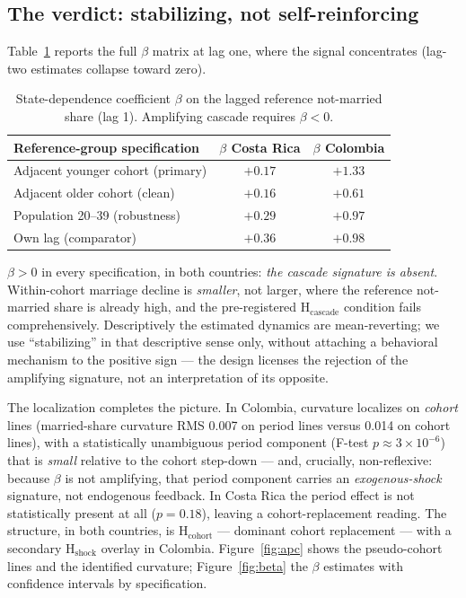 \subsection{The verdict: stabilizing, not self-reinforcing}
\label{sec:verdict}

Table~\ref{tab:beta} reports the full $\beta$ matrix at lag one, where the
signal concentrates (lag-two estimates collapse toward zero).

\begin{table}[t]
\centering
\caption{State-dependence coefficient $\beta$ on the lagged reference
not-married share (lag 1). Amplifying cascade requires $\beta<0$.}
\label{tab:beta}
\begin{tabular}{lcc}
\toprule
Reference-group specification & $\beta$ Costa Rica & $\beta$ Colombia \\
\midrule
Adjacent younger cohort (primary) & $+0.17$ & $+1.33$ \\
Adjacent older cohort (clean)     & $+0.16$ & $+0.61$ \\
Population 20--39 (robustness)    & $+0.29$ & $+0.97$ \\
Own lag (comparator)              & $+0.36$ & $+0.98$ \\
\bottomrule
\end{tabular}
\end{table}

$\beta > 0$ in every specification, in both countries: \emph{the cascade
signature is absent}. Within-cohort marriage decline is \emph{smaller}, not
larger, where the reference not-married share is already high, and the
pre-registered H$_{\text{cascade}}$ condition fails comprehensively.
Descriptively the estimated dynamics are mean-reverting; we use
``stabilizing'' in that descriptive sense only, without attaching a
behavioral mechanism to the positive sign --- the design licenses the
rejection of the amplifying signature, not an interpretation of its opposite.

The localization completes the picture. In Colombia, curvature localizes on
\emph{cohort} lines (married-share curvature RMS 0.007 on period lines versus
0.014 on cohort lines), with a statistically unambiguous period component
(F-test $p \approx 3\times10^{-6}$) that is \emph{small} relative to the cohort
step-down --- and, crucially, non-reflexive: because $\beta$ is not amplifying,
that period component carries an \emph{exogenous-shock} signature, not
endogenous feedback. In Costa Rica the period effect is not statistically
present at all ($p = 0.18$), leaving a cohort-replacement reading. The
structure, in both countries, is
H$_{\text{cohort}}$ --- dominant cohort replacement --- with a secondary
H$_{\text{shock}}$ overlay in Colombia. Figure~\ref{fig:apc} shows the
pseudo-cohort lines and the identified curvature; Figure~\ref{fig:beta} the
$\beta$ estimates with confidence intervals by specification.

